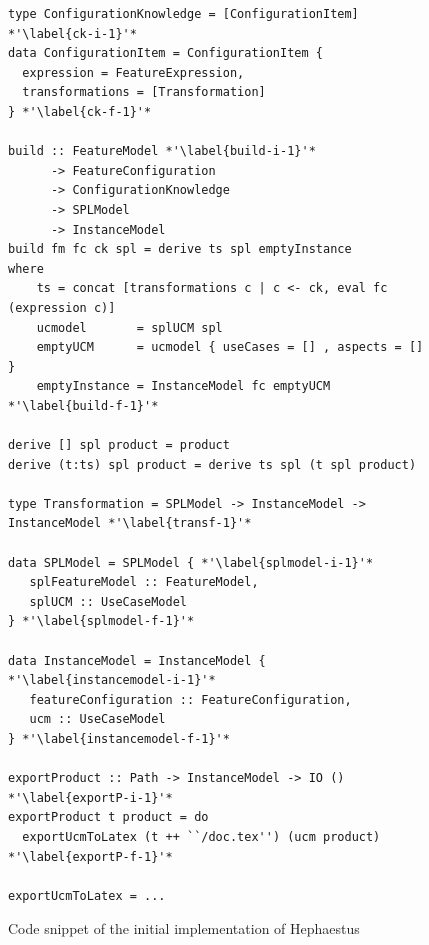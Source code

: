 \begin{figure}
\begin{lstlisting}
type ConfigurationKnowledge = [ConfigurationItem] *'\label{ck-i-1}'*
data ConfigurationItem = ConfigurationItem {
  expression = FeatureExpression,
  transformations = [Transformation]
} *'\label{ck-f-1}'*

build :: FeatureModel *'\label{build-i-1}'*
      -> FeatureConfiguration
      -> ConfigurationKnowledge
      -> SPLModel
      -> InstanceModel
build fm fc ck spl = derive ts spl emptyInstance
where
    ts = concat [transformations c | c <- ck, eval fc (expression c)]
    ucmodel       = splUCM spl
    emptyUCM      = ucmodel { useCases = [] , aspects = [] }
    emptyInstance = InstanceModel fc emptyUCM *'\label{build-f-1}'*

derive [] spl product = product
derive (t:ts) spl product = derive ts spl (t spl product)

type Transformation = SPLModel -> InstanceModel -> InstanceModel *'\label{transf-1}'*

data SPLModel = SPLModel { *'\label{splmodel-i-1}'*
   splFeatureModel :: FeatureModel,
   splUCM :: UseCaseModel
} *'\label{splmodel-f-1}'*

data InstanceModel = InstanceModel { *'\label{instancemodel-i-1}'*
   featureConfiguration :: FeatureConfiguration,
   ucm :: UseCaseModel
} *'\label{instancemodel-f-1}'*

exportProduct :: Path -> InstanceModel -> IO () *'\label{exportP-i-1}'*
exportProduct t product = do
  exportUcmToLatex (t ++ ``/doc.tex'') (ucm product) *'\label{exportP-f-1}'*

exportUcmToLatex = ...
\end{lstlisting}
\caption{Code snippet of the initial implementation of Hephaestus}
\label{fig:hephaestus-initial-code}
\end{figure}




